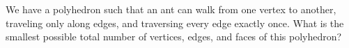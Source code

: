 We have a polyhedron such that an ant can walk from one vertex to another, traveling only along edges, and traversing every edge exactly once. What is the smallest possible total number of vertices, edges, and faces of this polyhedron?